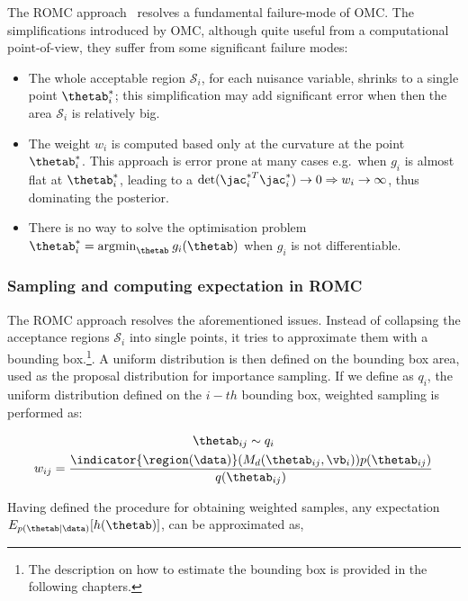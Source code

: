 The ROMC approach~\cite{Ikonomov2019} resolves a fundamental
failure-mode of OMC. The simplifications introduced by OMC, although
quite useful from a computational point-of-view, they suffer from some
significant failure modes:

\begin{itemize}
\item The whole acceptable region $\mathcal{S}_i$, for each nuisance variable,
  shrinks to a single point $\thetab_i^*$; this simplification may add
  significant error when then the area $\mathcal{S}_i$ is relatively big.
\item The weight $w_i$ is computed based only at the curvature at the
  point $\thetab_i^*$. This approach is error prone at many cases
  e.g.\ when $g_i$ is almost flat at $\thetab_i^*$, leading to a
  $\text{det}(\jac_i^{*T}\jac_i^*) \rightarrow 0 \Rightarrow w_i
  \rightarrow \infty$, thus dominating the posterior.
\item There is no way to solve the optimisation problem
  $\thetab_i^* = \text{argmin}_{\thetab} \: g_i(\thetab)$ when $g_i$
  is not differentiable.
\end{itemize}


\subsubsection{Sampling and computing expectation in ROMC}

The ROMC approach resolves the aforementioned issues. Instead of
collapsing the acceptance regions $\mathcal{S}_i$ into single points,
it tries to approximate them with a bounding box.\footnote{The
  description on how to estimate the bounding box is provided in the
  following chapters.}. A uniform distribution is then defined on the
bounding box area, used as the proposal distribution for importance
sampling. If we define as $q_i$, the uniform distribution defined on
the $i-th$ bounding box, weighted sampling is performed as:

\begin{gather}
  \label{eq:sampling}
  \thetab_{ij} \sim q_i \\
  w_{ij} = \frac{\indicator{\region(\data)}(M_d(\thetab_{ij}, \vb_i)) p(\thetab_{ij})}{q(\thetab_{ij})}
\end{gather}

\noindent
Having defined the procedure for obtaining weighted samples, any
expectation $E_{p(\thetab|\data)}[h(\thetab)]$, can be approximated
as,

